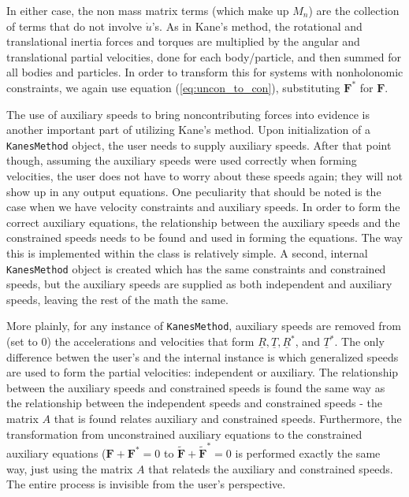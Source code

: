 \documentclass[twocolumn,10pt]{asme2e}
\begin{document}
In either case, the non mass matrix terms (which make up $M_n$) are the
collection of terms that do not involve $\dot{u}$'s.
As in Kane's method, the rotational and translational inertia forces and
torques are multiplied by the angular and translational partial velocities,
done for each body/particle, and then summed for all bodies and particles.
In order to transform this for systems with nonholonomic constraints, we again
use equation (\ref{eq:uncon_to_con}), substituting $\mathbf{F}^*$ for
$\mathbf{F}$.

The use of auxiliary speeds to bring noncontributing forces into evidence is
another important part of utilizing Kane's method.
Upon initialization of a \verb|KanesMethod| object, the user needs to supply
auxiliary speeds.
After that point though, assuming the auxiliary speeds were used correctly when
forming velocities, the user does not have to worry about these speeds again;
they will not show up in any output equations.
One peculiarity that should be noted is the case when we have velocity
constraints and auxiliary speeds.
In order to form the correct auxiliary equations, the relationship between the
auxiliary speeds and the constrained speeds needs to be found and used in
forming the equations.
The way this is implemented within the class is relatively simple.
A second, internal \verb|KanesMethod| object is created which has the same
constraints and constrained speeds, but the auxiliary speeds are supplied as
both independent and auxiliary speeds, leaving the rest of the math the same.

More plainly, for any instance of \verb|KanesMethod|, auxiliary speeds are
removed from (set to 0) the accelerations and velocities that form
$\underline{R}, \underline{T}, \underline{R}^*$, and $\underline{T}^*$.
The only difference betwen the user's and the internal instance is which
generalized speeds are used to form the partial velocities: independent or
auxiliary.
The relationship between the auxiliary speeds and constrained speeds is found
the same way as the relationship between the independent speeds and constrained
speeds - the matrix $A$ that is found relates auxiliary and constrained
speeds.
Furthermore, the transformation from unconstrained auxiliary equations to the
constrained auxiliary equations ($\mathbf{F} + \mathbf{F}^*=0$ to
$\tilde{\mathbf{F}} + \tilde{\mathbf{F}}^* = 0$ is performed exactly the same
way, just using the matrix $A$ that relateds the auxiliary and constrained
speeds.
The entire process is invisible from the user's perspective.
\end{document}
